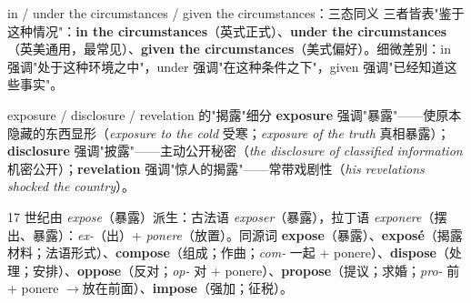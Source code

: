 \documentclass[../main.tex]{subfiles}
\begin{document}

\begin{gram}{in / under the circumstances / given the circumstances：三态同义}
三者皆表"鉴于这种情况"：\textbf{in the circumstances}（英式正式）、\textbf{under the circumstances}（英美通用，最常见）、\textbf{given the circumstances}（美式偏好）。细微差别：in 强调"处于这种环境之中"，under 强调"在这种条件之下"，given 强调"已经知道这些事实"。
\end{gram}





\begin{lex}{exposure / disclosure / revelation 的"揭露"细分}
\textbf{exposure} 强调"暴露"——使原本隐藏的东西显形（\textit{exposure to the cold} 受寒；\textit{exposure of the truth} 真相暴露）；\textbf{disclosure} 强调"披露"——主动公开秘密（\textit{the disclosure of classified information} 机密公开）；\textbf{revelation} 强调"惊人的揭露"——常带戏剧性（\textit{his revelations shocked the country}）。
\end{lex}

\begin{origin}
17 世纪由 \textit{expose}（暴露）派生：古法语 \textit{exposer}（暴露），拉丁语 \textit{exponere}（摆出、暴露）：\textit{ex-}（出）+ \textit{ponere}（放置）。同源词 \textbf{expose}（暴露）、\textbf{exposé}（揭露材料；法语形式）、\textbf{compose}（组成；作曲；\textit{com-} 一起 + ponere）、\textbf{dispose}（处理；安排）、\textbf{oppose}（反对；\textit{op-} 对 + ponere）、\textbf{propose}（提议；求婚；\textit{pro-} 前 + ponere $\to$放在前面）、\textbf{impose}（强加；征税）。
\end{origin}

\end{document}
